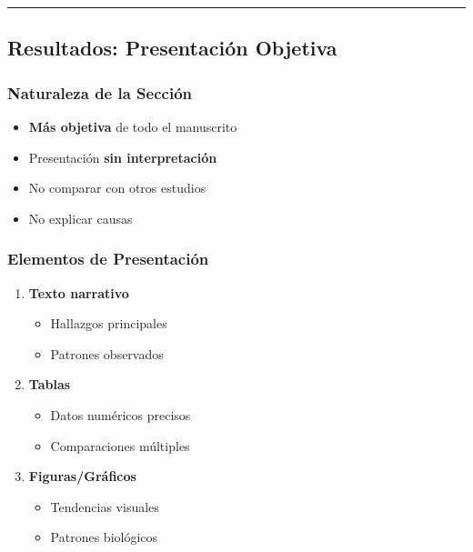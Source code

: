 \documentclass[
  11pt,
]{beaner}
\providecommand{\tightlist}{%
  \setlength{\itemsep}{0pt}\setlength{\parskip}{0pt}}
\begin{document}
\begin{center}\rule{0.5\linewidth}{0.5pt}\end{center}

\subsection{Resultados: Presentación
Objetiva}\label{resultados-presentaciuxf3n-objetiva}

\subsubsection{Naturaleza de la
Sección}\label{naturaleza-de-la-secciuxf3n}

\begin{itemize}
\tightlist
\item
  \textbf{Más objetiva} de todo el manuscrito
\item
  Presentación \textbf{sin interpretación}
\item
  No comparar con otros estudios
\item
  No explicar causas
\end{itemize}

\subsubsection{Elementos de
Presentación}\label{elementos-de-presentaciuxf3n}

\begin{enumerate}
\def\labelenumi{\arabic{enumi}.}
\tightlist
\item
  \textbf{Texto narrativo}

  \begin{itemize}
  \tightlist
  \item
    Hallazgos principales
  \item
    Patrones observados
  \end{itemize}
\item
  \textbf{Tablas}

  \begin{itemize}
  \tightlist
  \item
    Datos numéricos precisos
  \item
    Comparaciones múltiples
  \end{itemize}
\item
  \textbf{Figuras/Gráficos}

  \begin{itemize}
  \tightlist
  \item
    Tendencias visuales
  \item
    Patrones biológicos
  \end{itemize}
\end{enumerate}
\end{document}
